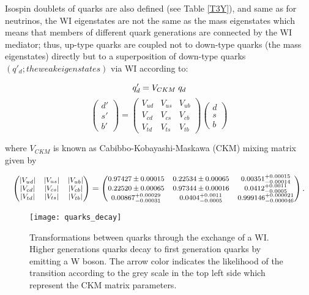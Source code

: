 Isospin doublets of quarks are also defined (see Table \ref{T3Y}), and same as for neutrinos, the WI eigenstates are not the same as the mass eigenstates which means that members of different quark generations are connected by the WI mediator; thus, up-type quarks are coupled not to down-type quarks (the mass eigenstates) directly but to a superposition of down-type quarks $(q'_d; the weak eigenstates)$ via WI according to: 

$$q'_d = V_{CKM}\hspace{0.1cm}q_d$$
\begin{equation}
\begin{pmatrix}d'\\ s'\\ b'\end{pmatrix}=\begin{pmatrix} V_{ud} & V_{us} & V_{ub}\\ V_{cd} & V_{cs} & V_{cb}\\ V_{td} & V_{ts} & V_{tb}\end{pmatrix}\begin{pmatrix}d\\s\\b\end{pmatrix}
\label{eq:qmixing}
\end{equation}

\noindent where $V_{CKM}$ is known as Cabibbo-Kobayashi-Maskawa (CKM) mixing matrix\cite{C,KM} given by  

\begin{equation}
\footnotesize
\begin{pmatrix}
|V_{ud}| & |V_{us}| & |V_{ub}| \\
|V_{cd}| & |V_{cs}| & |V_{cb}| \\
|V_{td}| & |V_{ts}| & |V_{tb}|
\end{pmatrix} = \begin{pmatrix}
0.97427 \pm 0.00015 & 0.22534 \pm 0.00065 & 0.00351^{+0.00015}_{-0.00014} \\
0.22520 \pm 0.00065 & 0.97344 \pm 0.00016 & 0.0412^{+0.0011}_{-0.0005} \\
0.00867^{+0.00029}_{-0.00031} & 0.0404^{+0.0011}_{-0.0005} & 0.999146^{+0.000021}_{-0.000046}
\end{pmatrix}.
\label{eq:ckm}
\end{equation}

\begin{figure}[!h]
  \centering
  \texttt{[image: quarks\_decay]}
  \caption[Transformations between quarks]{Transformations between quarks through the exchange of a WI. Higher generations quarks decay to first generation quarks by emitting a W boson. The arrow color indicates the likelihood of the transition according to the grey scale in the top left side which represent the CKM matrix parameters\cite{ckm}.}
  \label{quarks_decay}
\end{figure}

